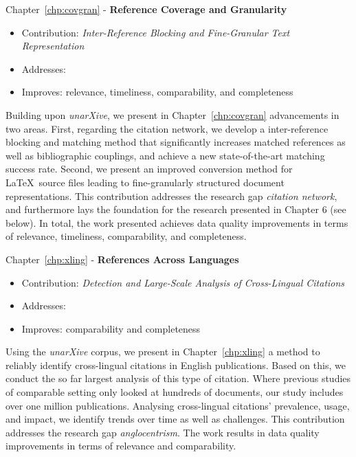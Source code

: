Chapter~\ref{chp:covgran} - \textbf{Reference Coverage and Granularity}
\begin{itemize}
    \setlength\itemsep{-0.5em}
    \item Contribution: \textit{Inter-Reference Blocking and Fine-Granular Text Representation}
    \item Addresses: 
    \item Improves: relevance, timeliness, comparability, and completeness
\end{itemize}
Building upon \emph{unarXive}, we present in Chapter~\ref{chp:covgran} advancements in two areas. First, regarding the citation network, we develop a inter-reference blocking and matching method that significantly increases matched references as well as bibliographic couplings, and achieve a new state-of-the-art matching success rate. Second, we present an improved conversion method for \LaTeX\ source files leading to fine-granularly structured document representations. %
This contribution addresses the research gap \emph{citation network}, and furthermore lays the foundation for the research presented in Chapter 6 (see below).
In total, the work presented achieves data quality improvements in terms of relevance, timeliness, comparability, and completeness.

Chapter~\ref{chp:xling} - \textbf{References Across Languages}
\begin{itemize}
    \setlength\itemsep{-0.5em}
    \item Contribution: \textit{Detection and Large-Scale Analysis of Cross-Lingual Citations}
    \item Addresses: 
    \item Improves: comparability and completeness
\end{itemize}
Using the \emph{unarXive} corpus, we present in Chapter~\ref{chp:xling} a method to reliably identify cross-lingual citations in English publications. Based on this, we conduct the so far largest analysis of this type of citation. Where previous studies of comparable setting only looked at hundreds of documents, our study includes over one million publications. Analysing cross-lingual citations' prevalence, usage, and impact, we identify trends over time as well as challenges.
This contribution addresses the research gap \emph{anglocentrism}.
The work results in data quality improvements in %
terms of 
relevance and comparability.

